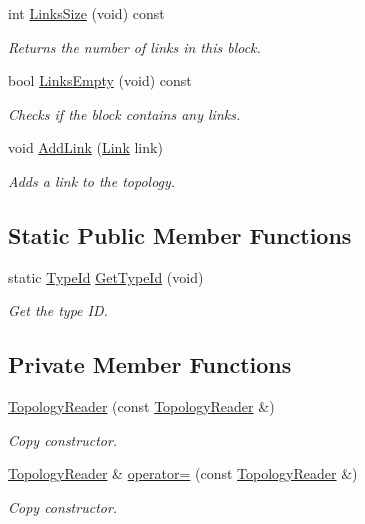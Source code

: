 \begin{DoxyCompactItemize}
int \hyperlink{classns3_1_1TopologyReader_ae610852021242bb82d7bae992a31ebb7}{Links\+Size} (void) const 
\begin{DoxyCompactList}\small\item\em Returns the number of links in this block. \end{DoxyCompactList}\item 
bool \hyperlink{classns3_1_1TopologyReader_afc6604c2fba020a61dd31a3d05eefe2d}{Links\+Empty} (void) const 
\begin{DoxyCompactList}\small\item\em Checks if the block contains any links. \end{DoxyCompactList}\item 
void \hyperlink{classns3_1_1TopologyReader_a0ecbd003f3e4c0c142720b20b8cfcbeb}{Add\+Link} (\hyperlink{classns3_1_1TopologyReader_1_1Link}{Link} link)
\begin{DoxyCompactList}\small\item\em Adds a link to the topology. \end{DoxyCompactList}\end{DoxyCompactItemize}
\subsection*{Static Public Member Functions}
\begin{DoxyCompactItemize}
\item 
static \hyperlink{classns3_1_1TypeId}{Type\+Id} \hyperlink{classns3_1_1TopologyReader_a44519cb4dfce47393c925f9d4eded556}{Get\+Type\+Id} (void)
\begin{DoxyCompactList}\small\item\em Get the type ID. \end{DoxyCompactList}\end{DoxyCompactItemize}
\subsection*{Private Member Functions}
\begin{DoxyCompactItemize}
\item 
\hyperlink{classns3_1_1TopologyReader_a0d2de97323e5963ef22f3ad64a3c06bd}{Topology\+Reader} (const \hyperlink{classns3_1_1TopologyReader}{Topology\+Reader} \&)
\begin{DoxyCompactList}\small\item\em Copy constructor. \end{DoxyCompactList}\item 
\hyperlink{classns3_1_1TopologyReader}{Topology\+Reader} \& \hyperlink{classns3_1_1TopologyReader_a1045bc005effe7297b7cc0b074d470fd}{operator=} (const \hyperlink{classns3_1_1TopologyReader}{Topology\+Reader} \&)
\begin{DoxyCompactList}\small\item\em Copy constructor. \end{DoxyCompactList}\end{DoxyCompactItemize}
